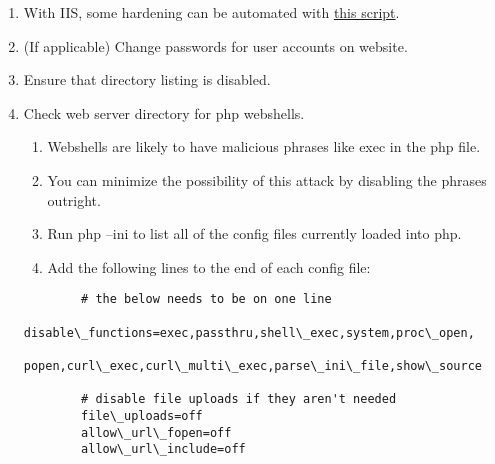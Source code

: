 \documentclass[12pt,letterpaper]{article}
\begin{document}
\begin{enumerate}
	\item With IIS, some hardening can be automated with \href{https://github.com/ufsitblue/blue/blob/main/dsu\_blue/windows/IIS.ps1}{this script}.
	\item (If applicable) Change passwords for user accounts on website.
	\item Ensure that directory listing is disabled.
	\item Check web server directory for php webshells.
	\begin{enumerate}
		\item Webshells are likely to have malicious phrases like exec in the php file.
		\item You can minimize the possibility of this attack by disabling the phrases outright.
		\item Run php --ini to list all of the config files currently loaded into php.
		\item Add the following lines to the end of each config file:
	\end{enumerate}
	{ \color{iris} \begin{verbatim}
		# the below needs to be on one line
		disable\_functions=exec,passthru,shell\_exec,system,proc\_open,
		popen,curl\_exec,curl\_multi\_exec,parse\_ini\_file,show\_source
		
		# disable file uploads if they aren't needed
		file\_uploads=off
		allow\_url\_fopen=off
		allow\_url\_include=off
		\end{verbatim} }		
\end{enumerate}
\end{document}
